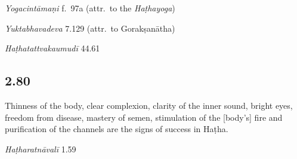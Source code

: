 \begin{ekdosis}
\begin{testimonia}[hp02_079]
\emph{Yogacintāmaṇi} f.~97a (attr.~to the \emph{Haṭhayoga})

\begin{versinnote}
\tl{\var{anargalaḥ ] L, antargataḥ N}\\!}
\end{versinnote}

\emph{Yuktabhavadeva} 7.129 (attr.~to Gorakṣanātha)

\begin{versinnote}
\end{versinnote}

\emph{Haṭhatattvakaumudī} 44.61

\begin{versinnote}
\end{versinnote}
\end{testimonia}


\subsection*{2.80}
\begin{translation}[hp02_080]
Thinness of the body, clear complexion, clarity of the inner sound,  bright eyes, freedom from disease, mastery of semen, stimulation of the [body’s] fire and purification of the channels are the signs of success in Haṭha.
\end{translation}

\begin{testimonia}[hp02_080]
\emph{Haṭharatnāvalī} 1.59


\end{testimonia}
\end{ekdosis}
